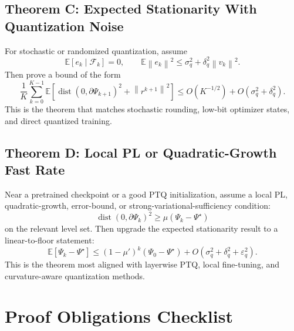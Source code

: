 \documentclass[11pt]{article}
\newcommand{\dist}{\operatorname{dist}}
\newcommand{\norm}[1]{\left\lVert #1 \right\rVert}
\begin{document}
\subsection{Theorem C: Expected Stationarity With Quantization Noise}

For stochastic or randomized quantization, assume
\begin{equation}
    \mathbb{E}[e_k\mid\mathcal F_k]=0,
    \qquad
    \mathbb{E}\norm{e_k}^2\le \sigma_q^2+\delta_q^2\norm{v_k}^2.
\end{equation}
Then prove a bound of the form
\begin{equation}
    \frac{1}{K}\sum_{k=0}^{K-1}
    \mathbb{E}
    \left[
        \dist(0,\partial\Psi_{k+1})^2+\norm{r^{k+1}}^2
    \right]
    \le
    O(K^{-1/2})+O(\sigma_q^2+\delta_q^2).
    \label{eq:noise-floor}
\end{equation}
This is the theorem that matches stochastic rounding, low-bit optimizer states,
and direct quantized training.

\subsection{Theorem D: Local PL or Quadratic-Growth Fast Rate}

Near a pretrained checkpoint or a good PTQ initialization, assume a local PL,
quadratic-growth, error-bound, or strong-variational-sufficiency condition:
\begin{equation}
    \dist(0,\partial\Psi_k)^2
    \ge
    \mu(\Psi_k-\Psi^\star)
\end{equation}
on the relevant level set.  Then upgrade the expected stationarity result to
a linear-to-floor statement:
\begin{equation}
    \mathbb{E}[\Psi_k-\Psi^\star]
    \le
    (1-\mu')^k(\Psi_0-\Psi^\star)
    +O(\sigma_q^2+\delta_q^2+\varepsilon_q^2).
\end{equation}
This is the theorem most aligned with layerwise PTQ, local fine-tuning, and
curvature-aware quantization methods.

\section{Proof Obligations Checklist}
\end{document}
